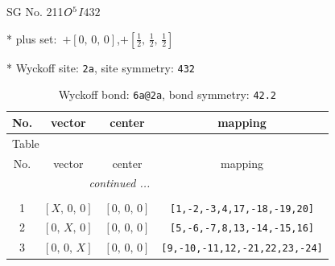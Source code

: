 \documentclass[fleqn,8pt]{jsarticle}
\begin{document}
\setcounter{MaxMatrixCols}{32}

\renewcommand{\tablename}{Table~}
\renewcommand{\figurename}{Figure~}
\begin{center}
\LARGE
SG No. 211\quad$O_{\rm }^{5}$\quad$I432$\quad[ cubic ]
\end{center}

* plus set:\,\,\,$+\left[ 0,\, 0,\, 0 \right]$,\quad $+\left[ \frac{1}{2},\, \frac{1}{2},\, \frac{1}{2} \right]$


* Wyckoff site: {\tt 2a}, site symmetry: {\tt 432}
\renewcommand{\arraystretch}{1.2}
\begin{longtable}{cccc}
\caption{Wyckoff bond: {\tt 6a@2a}, bond symmetry: {\tt 42.2}}
 \\
 \hline \hline
No. & vector & center & mapping \\ \hline \endfirsthead

\multicolumn{3}{l}{\tablename\ \thetable{}} \\
 \hline \hline
No. & vector & center & mapping \\ \hline \endhead

 \hline \hline
\multicolumn{3}{r}{\footnotesize\it continued ...} \\ \endfoot

 \hline \hline
\multicolumn{3}{r}{} \\ \endlastfoot

1 & $\left[ X,\, 0,\, 0 \right]$ & $\left[ 0,\, 0,\, 0 \right]$ & {\tt [1,-2,-3,4,17,-18,-19,20]} \\ \hline
2 & $\left[ 0,\, X,\, 0 \right]$ & $\left[ 0,\, 0,\, 0 \right]$ & {\tt [5,-6,-7,8,13,-14,-15,16]} \\ \hline
3 & $\left[ 0,\, 0,\, X \right]$ & $\left[ 0,\, 0,\, 0 \right]$ & {\tt [9,-10,-11,12,-21,22,23,-24]} \\
\end{longtable}
\renewcommand{\arraystretch}{1.2}
\end{document}
